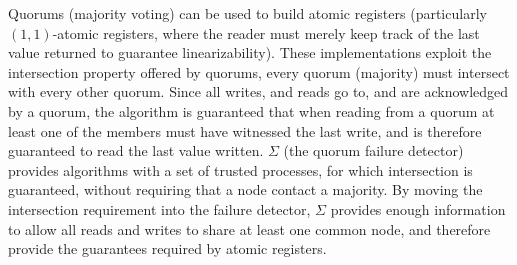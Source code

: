 Quorums (majority voting) can be used to build atomic registers (particularly $(1, 1)$-atomic registers, where the
reader must merely keep track of the last value returned to guarantee linearizability). These implementations exploit
the intersection property offered by quorums, \ie every quorum (majority) must intersect with every other quorum. Since
all writes, and reads go to, and are acknowledged by a quorum, the algorithm is guaranteed that when reading from a
quorum at least one of the members must have witnessed the last write, and is therefore guaranteed to read the last
value written. $\Sigma$ (the quorum failure detector) provides algorithms with a set of trusted processes, for which
intersection is guaranteed, without requiring that a node contact a majority. By moving the intersection requirement
into the  failure detector, $\Sigma$ provides enough information to allow all reads and writes to share at least one
common node, and therefore provide the guarantees required by atomic registers. 
